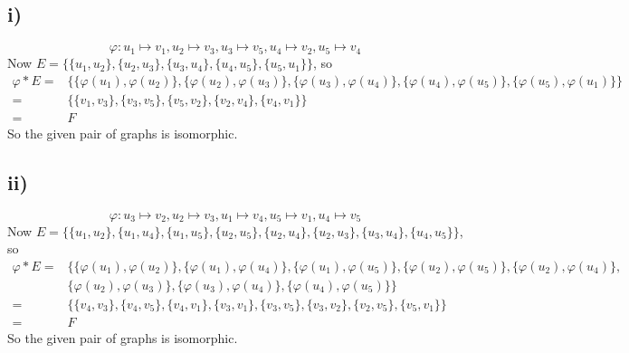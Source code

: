 \documentclass[a4paper,12pt,titlepage]{article}
\begin{document}
\subsection*{i)}
$$\varphi:u_1\mapsto v_1,u_2\mapsto v_3,u_3\mapsto v_5,u_4\mapsto v_2,u_5\mapsto v_4$$
Now $E=\lbrace \lbrace u_1,u_2\rbrace,\lbrace u_2,u_3\rbrace,\lbrace u_3,u_4\rbrace,\lbrace u_4,u_5\rbrace,\lbrace u_5,u_1\rbrace\rbrace$, so
\begin{align*}
\varphi* E=&\lbrace \lbrace \varphi(u_1),\varphi(u_2)\rbrace,\lbrace \varphi(u_2),\varphi(u_3)\rbrace,\lbrace \varphi(u_3),\varphi(u_4)\rbrace,\lbrace \varphi(u_4),\varphi(u_5)\rbrace,\lbrace \varphi(u_5),\varphi(u_1)\rbrace\rbrace\\
=&\lbrace \lbrace v_1,v_3\rbrace,\lbrace v_3,v_5\rbrace,\lbrace v_5,v_2\rbrace,\lbrace v_2,v_4\rbrace,\lbrace v_4,v_1\rbrace\rbrace\\
=&F
\end{align*}
So the given pair of graphs is isomorphic.
\subsection*{ii)}
$$\varphi:u_3\mapsto v_2,u_2\mapsto v_3,u_1\mapsto v_4,u_5\mapsto v_1,u_4\mapsto v_5$$
Now $E=\lbrace \lbrace u_1,u_2\rbrace,\lbrace u_1,u_4\rbrace,\lbrace u_1,u_5\rbrace,\lbrace u_2,u_5\rbrace,\lbrace u_2,u_4\rbrace,\lbrace u_2,u_3\rbrace,\lbrace u_3,u_4\rbrace,\lbrace u_4,u_5\rbrace\rbrace$, so
\begin{align*}
\varphi* E=&\lbrace \lbrace \varphi(u_1),\varphi(u_2)\rbrace, \lbrace \varphi(u_1),\varphi(u_4)\rbrace, \lbrace \varphi(u_1),\varphi(u_5)\rbrace, \lbrace \varphi(u_2),\varphi(u_5)\rbrace,\lbrace \varphi(u_2),\varphi(u_4)\rbrace,\\&\lbrace \varphi(u_2),\varphi(u_3)\rbrace,\lbrace \varphi(u_3),\varphi(u_4)\rbrace,\lbrace \varphi(u_4),\varphi(u_5)\rbrace\rbrace\\
=&\lbrace \lbrace v_4,v_3\rbrace,\lbrace v_4,v_5\rbrace,\lbrace v_4,v_1\rbrace,\lbrace v_3,v_1\rbrace,\lbrace v_3,v_5\rbrace,\lbrace v_3,v_2\rbrace,\lbrace v_2,v_5\rbrace,\lbrace v_5,v_1\rbrace\rbrace\\
=&F
\end{align*}
So the given pair of graphs is isomorphic.
\end{document}
